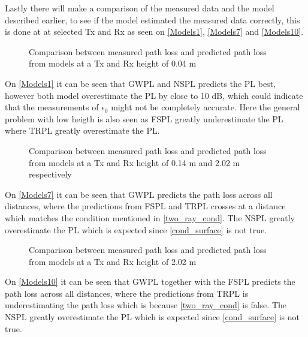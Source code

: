 Lastly there will make a comparison of the measured data and the model described earlier, to see if the model estimated the measured data correctly, this is done at at selected Tx and Rx as seen on \autoref{Models1}, \autoref{Models7} and \autoref{Models10}.



\begin{figure}[!htbp]
\centering

\caption{Comparison between measured path loss and predicted path loss from models at a Tx and Rx height of 0.04 m}
\label{Models1}
\end{figure}

On \autoref{Models1} it can be seen that GWPL and NSPL predicts the PL best, however both model overestimate the PL by close to 10 dB, which could indicate that the measurements of $\epsilon_0$ might not be completely accurate. Here the general problem with low heigth is also seen as FSPL greatly underestimate the PL where TRPL greatly overestimate the PL.

\begin{figure}[!htbp]
\centering

\caption{Comparison between measured path loss and predicted path loss from models at a Tx and Rx height of 0.14 m and 2.02 m respectively}
\label{Models7}
\end{figure}

On \autoref{Models7} it can be seen that GWPL predicts the path loss across all distances, where the predictions from FSPL and TRPL crosses at a distance which matches the condition mentioned in \autoref{two_ray_cond}. The NSPL greatly overestimate the PL which is expected since \autoref{cond_surface} is not true.

\begin{figure}[!htbp]
\centering

\caption{Comparison between measured path loss and predicted path loss from models at a Tx and Rx height of 2.02 m}
\label{Models10}
\end{figure}

On \autoref{Models10} it can be seen that GWPL together with the FSPL predicts the path loss across all distances, where the predictions from TRPL is underestimating the path loss which is because \autoref{two_ray_cond} is false. The NSPL greatly overestimate the PL which is expected since \autoref{cond_surface} is not true.

